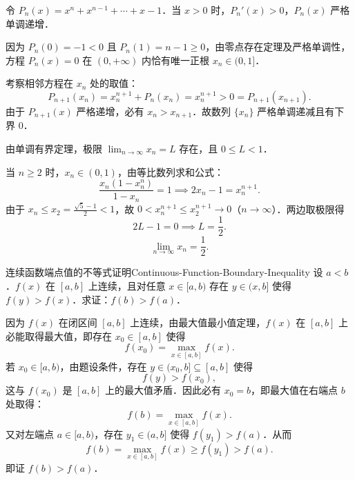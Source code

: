 \begin{solution}
    令 $P_n(x) = x^n + x^{n-1} + \cdots + x - 1$．当 $x > 0$ 时，$P_n'(x) > 0$，$P_n(x)$ 严格单调递增．

    因为 $P_n(0) = -1 < 0$ 且 $P_n(1) = n - 1 \geqslant 0$，由零点存在定理及严格单调性，方程 $P_n(x) = 0$ 在 $(0, +\infty)$ 内恰有唯一正根 $x_n \in (0, 1]$．

    考察相邻方程在 $x_n$ 处的取值：
    \begin{equation}
        P_{n+1}(x_n) = x_n^{n+1} + P_n(x_n) = x_n^{n+1} > 0 = P_{n+1}(x_{n+1}).
    \end{equation}
    由于 $P_{n+1}(x)$ 严格递增，必有 $x_n > x_{n+1}$．故数列 $\{x_n\}$ 严格单调递减且有下界 $0$．

    由单调有界定理，极限 $\lim_{n\to\infty} x_n = L$ 存在，且 $0 \leqslant L < 1$．

    当 $n \geqslant 2$ 时，$x_n \in (0, 1)$，由等比数列求和公式：
    \begin{equation}
        \frac{x_n(1 - x_n^n)}{1 - x_n} = 1 \implies 2x_n - 1 = x_n^{n+1}.
    \end{equation}
    由于 $x_n \leqslant x_2 = \frac{\sqrt{5}-1}{2} < 1$，故 $0 < x_n^{n+1} \leqslant x_2^{n+1} \to 0$（$n \to \infty$）．两边取极限得
    \begin{equation}
        2L - 1 = 0 \implies L = \frac{1}{2}.
    \end{equation}
    \begin{equation}
        \boxed{\lim_{n\to\infty} x_n = \frac{1}{2}.}
    \end{equation}
\end{solution}

\begin{problem}{连续函数端点值的不等式证明}{Continuous-Function-Boundary-Inequality}
    设 $a < b$．$f(x)$ 在 $[a, b]$ 上连续，且对任意 $x \in [a, b)$ 存在 $y \in (x, b]$ 使得 $f(y) > f(x)$．求证：$f(b) > f(a)$．
\end{problem}

\begin{myproof}
    因为 $f(x)$ 在闭区间 $[a, b]$ 上连续，由最大值最小值定理，$f(x)$ 在 $[a, b]$ 上必能取得最大值，即存在 $x_0 \in [a, b]$ 使得
    \begin{equation}
        f(x_0) = \max_{x\in [a, b]} f(x).
    \end{equation}
    若 $x_0 \in [a, b)$，由题设条件，存在 $y \in (x_0, b] \subseteq [a, b]$ 使得
    \begin{equation}
        f(y) > f(x_0),
    \end{equation}
    这与 $f(x_0)$ 是 $[a, b]$ 上的最大值矛盾．因此必有 $x_0 = b$，即最大值在右端点 $b$ 处取得：
    \begin{equation}
        f(b) = \max_{x\in [a, b]} f(x).
    \end{equation}
    又对左端点 $a \in [a, b)$，存在 $y_1 \in (a, b]$ 使得 $f(y_1) > f(a)$．从而
    \begin{equation}
        f(b) = \max_{x\in [a, b]} f(x) \geqslant f(y_1) > f(a).
    \end{equation}
    即证 $f(b) > f(a)$．
\end{myproof}

\endinput
